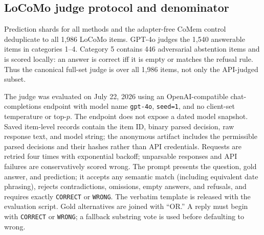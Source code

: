 \subsection{LoCoMo judge protocol and denominator}
Prediction shards for all methods and the adapter-free CoMem control deduplicate
to all 1,986 LoCoMo items.
GPT-4o judges the 1,540 answerable items in categories 1--4. Category 5 contains
446 adversarial abstention items and is scored locally: an answer is correct iff
it is empty or matches the refusal rule. Thus the canonical full-set judge is
over all 1,986 items, not only the API-judged subset.

\begin{center}
\small
\captionsetup{hypcap=false}
\setlength{\tabcolsep}{3pt}
\label{tab:locomo-categories}
\end{center}

The judge was evaluated on July 22, 2026 using an OpenAI-compatible
chat-completions endpoint with model name \texttt{gpt-4o}, \texttt{seed=1}, and
no client-set temperature or top-$p$. The endpoint does not expose a dated
model snapshot. Saved item-level records contain the item ID, binary parsed
decision, raw response text, and model string; the anonymous artifact includes
the permissible parsed decisions and their hashes rather than API credentials.
Requests are retried four
times with exponential backoff; unparsable responses and API failures are
conservatively scored wrong. The prompt presents the question, gold answer, and prediction; it accepts any
semantic match (including equivalent date phrasing), rejects contradictions,
omissions, empty answers, and refusals, and requires exactly
\texttt{CORRECT} or \texttt{WRONG}. The verbatim template is released with the
evaluation script.
Gold alternatives are joined with ``OR.'' A reply must begin with
\texttt{CORRECT} or \texttt{WRONG}; a fallback substring vote is used before
defaulting to wrong.

